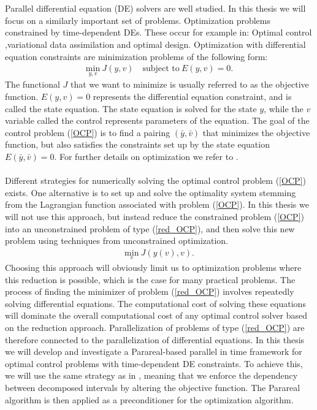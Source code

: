 \\
\\
Parallel differential equation (DE) solvers are well studied. In this thesis we will focus on a similarly important set of problems. Optimization problems constrained by time-dependent DEs. These occur for example in: Optimal control ,variational data assimilation and optimal design. Optimization with differential equation constraints are minimization problems of the following form:
\begin{align}
\underset{y,v}{\text{min}} \ J(y,v) \quad \textrm{subject to} \ E(y,v)=0. \label{OCP}
\end{align}
The functional $J$ that we want to minimize is usually referred to as the objective function. $E(y,v)=0$ represents the differential equation constraint, and is called the state equation. The state equation is solved for the state $y$, while the $v$ variable called the control represents parameters of the equation. The goal of the control problem (\ref{OCP}) is to find a pairing $(\bar y,\bar v)$ that minimizes the objective function, but also satisfies the constraints set up by the state equation $ E(\bar y,\bar v)=0$.  For further details on optimization we refer to \cite{hinze2008optimization}.
\\
\\
Different strategies for numerically solving the optimal control problem (\ref{OCP}) exists. One alternative is to set up and solve the optimality system stemming from the Lagrangian function associated with problem (\ref{OCP}). In this thesis we will not use this approach, but instead reduce the constrained problem (\ref{OCP}) into an unconstrained problem of type (\ref{red_OCP}), and then solve this new problem using techniques from unconstrained optimization. 
\begin{align}
\underset{v}{\text{min}} \ J(y(v),v). \label{red_OCP}
\end{align}
Choosing this approach will obviously limit us to optimization problems where this reduction is possible, which is the case for many practical problems. The process of finding the minimizer of problem (\ref{red_OCP}) involves repeatedly solving differential equations. The computational cost of solving these equations will dominate the overall computational cost of any optimal control solver based on the reduction approach. Parallelization of problems of type (\ref{red_OCP}) are therefore connected to the parallelization of differential equations. In this thesis we will develop and investigate a Parareal-based parallel in time framework for optimal control problems with time-dependent DE constraints. To achieve this, we will use the same strategy as in \cite{maday2002parareal}, meaning that we enforce the dependency between decomposed intervals by altering the objective function. The Parareal algorithm is then applied as a preconditioner for the optimization algorithm. 
